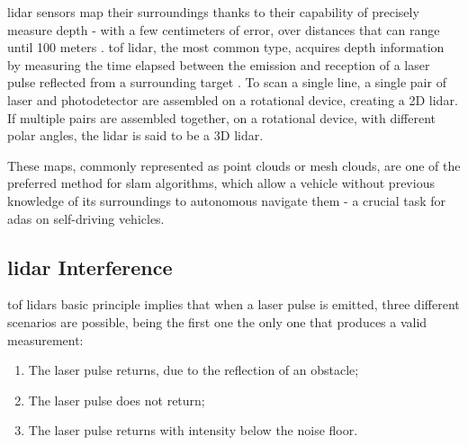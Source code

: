 \documentclass[extendedabs]{recpad2k}
\begin{document}
\gls{lidar} sensors map their surroundings thanks to their capability of precisely measure depth - with a few centimeters of error, over distances that can range until 100 meters \cite{vlp16, Sullivan2016}. \gls{tof} \gls{lidar}, the most common type, acquires depth information by measuring the time elapsed between the emission and reception of a laser pulse reflected from a surrounding target \cite{Sullivan2016}. To scan a single line, a single pair of laser and photodetector are assembled on a rotational device, creating a 2D \gls{lidar}. If multiple pairs are assembled together, on a rotational device, with different polar angles, the \gls{lidar} is said to be a 3D \gls{lidar}.

These maps, commonly represented as point clouds or mesh clouds, are one of the preferred method for \gls{slam} algorithms, which allow a vehicle without previous knowledge of its surroundings to autonomous navigate them - a crucial task for \gls{adas} on self-driving vehicles.







 



\subsection{\gls{lidar} Interference}
\gls{tof} \gls{lidar}s basic principle implies that when a laser pulse is emitted, three different scenarios are possible, being the first one the only one that produces a valid measurement:
\begin{enumerate}
    \itemsep0em
    \item The laser pulse returns, due to the reflection of an obstacle;
    \item The laser pulse does not return;
    \item The laser pulse returns with intensity below the noise floor.
\end{enumerate}
\end{document}

